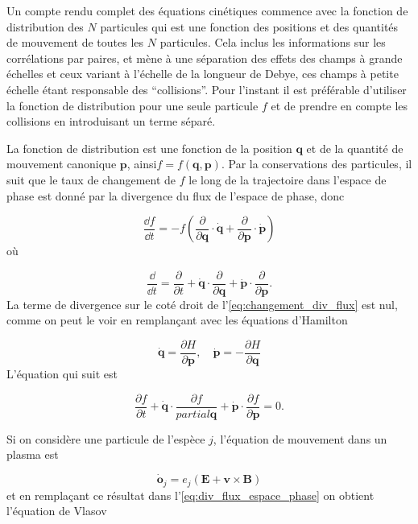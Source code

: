 \documentclass[main.tex]{subfiles}
\begin{document}
Un compte rendu complet des équations cinétiques commence avec la fonction de distribution des \( N \) particules qui est une fonction des positions et des quantités de mouvement de toutes les \( N \) particules.
Cela inclus les informations sur les corrélations par paires, et mène à une séparation des effets des champs à grande échelles et ceux variant à l'échelle de la longueur de Debye, ces champs à petite échelle étant responsable des ``collisions''.
Pour l'instant il est préférable d'utiliser la fonction de distribution pour une seule particule \( f \) et de prendre en compte les collisions en introduisant un terme séparé.

La fonction de distribution est une fonction de la position \( \bm{q} \) et de la quantité de mouvement canonique \( \bm{p} \),  ainsi\( f = f\left( \bm{q}, \bm{p} \right) \).
Par la conservations des particules, il suit que le taux de changement de \( f \) le long de la trajectoire dans l'espace de phase est donné par la divergence du flux de l'espace de phase, donc

\begin{equation}
	\frac{\dd f}{\dd t} = - f \left( \frac{\partial}{\partial \bm{q}} \cdot \bm{\dot{q}} + \frac{\partial}{\partial \bm{p}} \cdot \bm{\dot{p}} \right)
	\label{eq:changement_div_flux}
\end{equation}
où

\[
	\frac{\dd}{\dd t} = \frac{\partial }{\partial t} + \bm{\dot{q}} \cdot \frac{\partial}{\partial \bm{q}} + \bm{\dot{p}} \cdot \frac{\partial}{\partial \bm{p}}.
\]
La terme de divergence sur le coté droit de l'\autoref{eq:changement_div_flux} est nul, comme on peut le voir en remplançant  avec les équations d'Hamilton

\[
	\bm{\dot{q}} = \frac{\partial H}{\partial \bm{p}}, \quad \bm{\dot{p}} = - \frac{\partial H}{\partial \bm{q}}
\]
L'équation qui suit est

\begin{equation}
	\frac{\partial f}{\partial t} + \bm{\dot{q}} \cdot \frac{\partial f}{partial \bm{q}} + \bm{\dot{p}} \cdot \frac{\partial f}{\partial \bm{p}} = 0.
	\label{eq:div_flux_espace_phase}
\end{equation}

Si on considère une particule de l'espèce \( j \), l'équation de mouvement dans un plasma est

\[
	\bm{\dot{o}}_j = e_j \left( \bm{E} + \bm{v} \times \bm{B} \right)
\]
et en remplaçant ce résultat dans l'\autoref{eq:div_flux_espace_phase} on obtient l'équation de Vlasov
\end{document}
